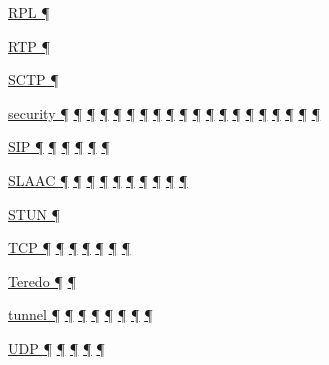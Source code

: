 \documentclass[
]{article}
\begin{document}
\hyperref[routing]{RPL ¶}

\hyperref[transport-protocols]{RTP ¶}

\hyperref[transport-protocols]{SCTP ¶}

\hyperref[why-ipv6-is-so-complicated]{security ¶} \hyperref[dns]{¶}
\hyperref[extension-headers-and-options]{¶}
\hyperref[managed-configuration]{¶} \hyperref[packet-format]{¶}
\hyperref[source-and-destination-address-selection]{¶}
\hyperref[dual-stack-scenarios]{¶}
\hyperref[ipv6-primary-differences-from-ipv4]{¶}
\hyperref[obsolete-techniques]{¶}
\hyperref[translation-and-ipv4-as-a-service]{¶} \hyperref[security]{¶}
\hyperref[filtering]{¶} \hyperref[layer-2-considerations]{¶}
\hyperref[topology-obfuscation]{¶}
\hyperref[address-and-prefix-management]{¶}
\hyperref[multi-prefix-operation]{¶} \hyperref[security-operation]{¶}
\hyperref[deployment-in-the-enterprise]{¶}
\hyperref[obsolete-features-in-ipv6]{¶} \hyperref[further-reading]{¶}

\hyperref[why-ipv6-is-so-complicated]{SIP ¶} \hyperref[why-version-6]{¶}
\hyperref[transport-protocols]{¶} \hyperref[dual-stack-scenarios]{¶}
\hyperref[translation-and-ipv4-as-a-service]{¶}
\hyperref[multihoming]{¶}

\hyperref[why-ipv6-is-so-complicated]{SLAAC ¶}
\hyperref[auto-configuration]{¶} \hyperref[managed-configuration]{¶}
\hyperref[routing]{¶} \hyperref[ipv6-primary-differences-from-ipv4]{¶}
\hyperref[security]{¶} \hyperref[filtering]{¶}
\hyperref[layer-2-considerations]{¶}
\hyperref[address-and-prefix-management]{¶}
\hyperref[multi-prefix-operation]{¶}

\hyperref[transport-protocols]{STUN ¶}

\hyperref[why-version-6]{TCP ¶} \hyperref[addresses]{¶}
\hyperref[extension-headers-and-options]{¶} \hyperref[packet-format]{¶}
\hyperref[traffic-class-and-flow-label]{¶}
\hyperref[transport-protocols]{¶} \hyperref[multihoming]{¶}

\hyperref[why-ipv6-is-so-complicated]{Teredo ¶}
\hyperref[obsolete-techniques]{¶}

\hyperref[layer-2-functions]{tunnel ¶}
\hyperref[traffic-class-and-flow-label]{¶}
\hyperref[coexistence-with-legacy-ipv4]{¶}
\hyperref[dual-stack-scenarios]{¶} \hyperref[obsolete-techniques]{¶}
\hyperref[translation-and-ipv4-as-a-service]{¶} \hyperref[tunnels]{¶}
\hyperref[layer-2-considerations]{¶}

\hyperref[extension-headers-and-options]{UDP ¶}
\hyperref[managed-configuration]{¶} \hyperref[packet-format]{¶}
\hyperref[transport-protocols]{¶} \hyperref[obsolete-techniques]{¶}
\end{document}
